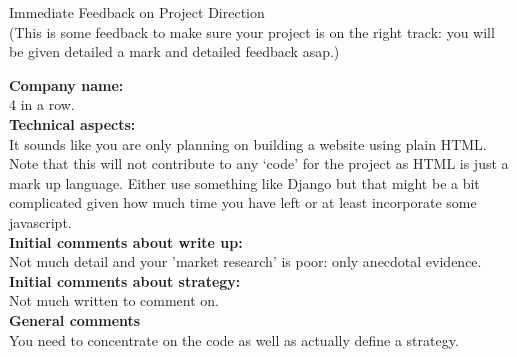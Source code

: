 \documentclass{article}
\begin{document}
\begin{center}
\Huge{Immediate Feedback on Project Direction}\\
\tiny{(This is some feedback to make sure your project is on the right track: you will be given detailed a mark and detailed feedback asap.)}
\end{center}


\normalsize
\textbf{Company name:}\\

4 in a row. \\

\textbf{Technical aspects:}\\

It sounds like you are only planning on building a website using plain HTML.
Note that this will not contribute to any `code' for the project as HTML is just a mark up language.
Either use something like Django but that might be a bit complicated given how much time you have left or at least incorporate some javascript.\\

\textbf{Initial comments about write up:}\\

Not much detail and your 'market research' is poor: only anecdotal evidence.\\

\textbf{Initial comments about strategy:}\\

Not much written to comment on.\\

\textbf{General comments}\\

You need to concentrate on the code as well as actually define a strategy.\\
\end{document}
